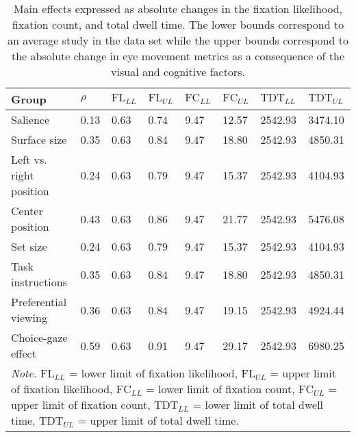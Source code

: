 \begin{table}[ht]
\centering
\caption{Main effects expressed as absolute changes in the fixation likelihood, fixation count, and total dwell time. The lower bounds correspond to an average study in the data set while the upper bounds correspond to the absolute change in eye movement metrics as a consequence of the visual and cognitive factors.} 
\label{tab:em_results}
\begingroup\small
\begin{tabular}{p{3.7cm}p{1.2cm}p{1.3cm}p{1.3cm}p{1.3cm}p{1.3cm}p{1.6cm}p{1.6cm}}
  \hline
Group & $\rho$ & $\textrm{FL}_{LL}$ & $\textrm{FL}_{UL}$ & $\textrm{FC}_{LL}$ & $\textrm{FC}_{UL}$ & $\textrm{TDT}_{LL}$ & $\textrm{TDT}_{UL}$ \\ 
  \hline
Salience & 0.13 & 0.63 & 0.74 & 9.47 & 12.57 & 2542.93 & 3474.10 \\ 
  Surface size & 0.35 & 0.63 & 0.84 & 9.47 & 18.80 & 2542.93 & 4850.31 \\ 
  Left vs. right position & 0.24 & 0.63 & 0.79 & 9.47 & 15.37 & 2542.93 & 4104.93 \\ 
  Center position & 0.43 & 0.63 & 0.86 & 9.47 & 21.77 & 2542.93 & 5476.08 \\ 
  Set size & 0.24 & 0.63 & 0.79 & 9.47 & 15.37 & 2542.93 & 4104.93 \\ 
  Task instructions & 0.35 & 0.63 & 0.84 & 9.47 & 18.80 & 2542.93 & 4850.31 \\ 
  Preferential viewing & 0.36 & 0.63 & 0.84 & 9.47 & 19.15 & 2542.93 & 4924.44 \\ 
  Choice-gaze effect & 0.59 & 0.63 & 0.91 & 9.47 & 29.17 & 2542.93 & 6980.25 \\ 
   \hline 
 \multicolumn{8}{p{0.95\textwidth}}{\scriptsize{\textit{Note.} $\textrm{FL}_{LL}$ = lower limit of fixation likelihood, $\textrm{FL}_{UL}$ = upper limit of fixation likelihood, $\textrm{FC}_{LL}$ = lower limit of fixation count, $\textrm{FC}_{UL}$ = upper limit of fixation count, $\textrm{TDT}_{LL}$ = lower limit of total dwell time, $\textrm{TDT}_{UL}$ = upper limit of total dwell time.}} 
\end{tabular}
\endgroup
\end{table}

